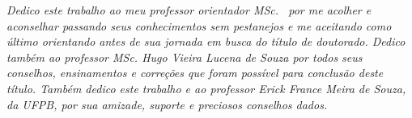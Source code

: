 \begin{dedicatoria}
	\vspace*{\fill}
		\centering
		\noindent
		\textit{ 
			Dedico este trabalho ao meu professor orientador MSc. \imprimirorientador\ por me acolher e aconselhar passando seus conhecimentos sem pestanejos e me aceitando como último orientando antes de sua jornada em busca do título de doutorado. Dedico também ao professor MSc. Hugo Vieira Lucena de Souza por todos seus conselhos, ensinamentos e correções que foram possível para conclusão deste título. Também dedico este trabalho e ao professor Erick France Meira de Souza, da UFPB, por sua amizade, suporte e preciosos conselhos dados.
		} \vspace*{\fill}
\end{dedicatoria}
